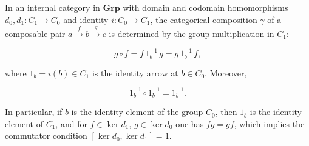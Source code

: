 In an internal category in $\mathbf{Grp}$ with domain and codomain homomorphisms $d_0, d_1 : C_1 \rightarrow C_0$ and identity $i : C_0 \rightarrow C_1$, the categorical composition $\gamma$ of a composable pair $a \xrightarrow{f} b \xrightarrow{g} c$ is determined by the group multiplication in $C_1$:

$$g \circ f = f \, 1_b^{-1} \, g = g \, 1_b^{-1} \, f,$$

where $1_b = i(b) \in C_1$ is the identity arrow at $b \in C_0$. Moreover,

$$1_b^{-1} \circ 1_b^{-1} = 1_b^{-1}.$$

In particular, if $b$ is the identity element of the group $C_0$, then $1_b$ is the identity element of $C_1$, and for $f \in \ker d_1$, $g \in \ker d_0$ one has $fg = gf$, which implies the commutator condition $[\ker d_0, \ker d_1] = 1$.
